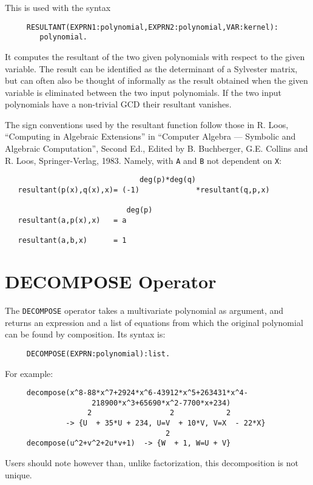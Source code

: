 This is used with the syntax
\begin{verbatim}
     RESULTANT(EXPRN1:polynomial,EXPRN2:polynomial,VAR:kernel):
        polynomial.
\end{verbatim}
It computes the resultant of the two given polynomials with respect to the
given variable. The result can be identified as the determinant of a
Sylvester matrix, but can often also be thought of informally as the
result obtained when the given variable is eliminated between the two input
polynomials. If the two input polynomials have a non-trivial GCD their
resultant vanishes.

The sign conventions used by the resultant function follow those in R.
Loos, ``Computing in Algebraic Extensions'' in ``Computer Algebra --- Symbolic
and Algebraic Computation'', Second Ed., Edited by B. Buchberger, G.E.
Collins and R. Loos, Springer-Verlag, 1983. Namely, with {\tt A} and {\tt B}
not dependent on {\tt X}:
\begin{samepage}
\begin{verbatim}
                               deg(p)*deg(q)
   resultant(p(x),q(x),x)= (-1)             *resultant(q,p,x)

                            deg(p)
   resultant(a,p(x),x)   = a

   resultant(a,b,x)      = 1
\end{verbatim}
\end{samepage}

\section{DECOMPOSE Operator}

The {\tt DECOMPOSE} operator takes a multivariate polynomial as argument,
and returns an expression and a list of equations from which the
original polynomial can be found by composition.  Its syntax is:
\begin{verbatim}
     DECOMPOSE(EXPRN:polynomial):list.
\end{verbatim}
For example:
\begin{verbatim}
     decompose(x^8-88*x^7+2924*x^6-43912*x^5+263431*x^4-
                    218900*x^3+65690*x^2-7700*x+234)
                   2                  2            2
              -> {U  + 35*U + 234, U=V  + 10*V, V=X  - 22*X}
                                     2
     decompose(u^2+v^2+2u*v+1)  -> {W  + 1, W=U + V}
\end{verbatim}
Users should note however than, unlike factorization, this decomposition
is not unique.

